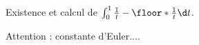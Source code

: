 \begin{enonce}
\begin{exercise}[ID={RMS121-2 E1057 (TPE)},subtitle={},tags={}]
  Existence et calcul de $\int_0^1 \frac1t-\floor*{\frac1t} \d t$.
\end{exercise}
\begin{solution}
Attention : constante d'Euler....
\end{solution}
\end{enonce}
